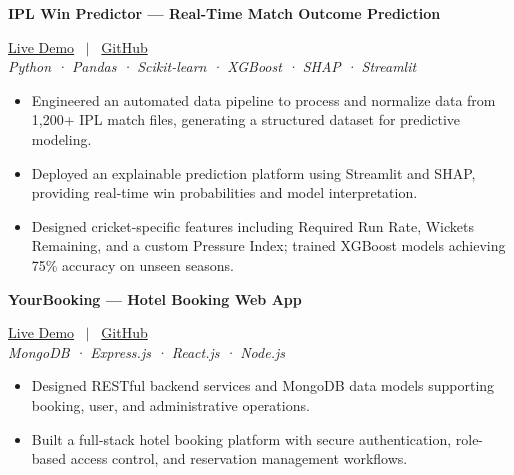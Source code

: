 \documentclass[10pt, a4paper]{article}
\begin{document}
\noindent \textbf{IPL Win Predictor --- Real-Time Match Outcome Prediction} \hfill 

\small{
\href{https://ipl-win-probability-predictor-fpzxwaxr5tepzwdugousfe.streamlit.app/}{Live Demo}
 \ $|$ \ \href{https://github.com/PankajKumar-11/IPL-Win-Probability-Predictor}{GitHub}
}
 \\
\textit{\small{Python · Pandas · Scikit-learn · XGBoost · SHAP · Streamlit}}
\begin{itemize}

    \item Engineered an automated data pipeline to process and normalize data from 1,200+ IPL match files, generating a structured dataset for predictive modeling.

    \item Deployed an explainable prediction platform using Streamlit and SHAP, providing real-time win probabilities and model interpretation.

    \item Designed cricket-specific features including Required Run Rate, Wickets Remaining, and a custom Pressure Index; trained XGBoost models achieving 75\% accuracy on unseen seasons.

\end{itemize}
\vspace{3pt}

\noindent \textbf{YourBooking --- Hotel Booking Web App} \hfill 

\small{
\href{https://yourbookingweb.netlify.app/}{Live Demo}
 \ $|$ \ \href{https://github.com/PankajKumar-11/YourBooking-Hotel-booking-Web-}{GitHub}
}
 \\
\textit{\small{MongoDB · Express.js · React.js · Node.js}}
\begin{itemize}

    \item Designed RESTful backend services and MongoDB data models supporting booking, user, and administrative operations.

    \item Built a full-stack hotel booking platform with secure authentication, role-based access control, and reservation management workflows.

\end{itemize}
\vspace{3pt}


\end{document}
